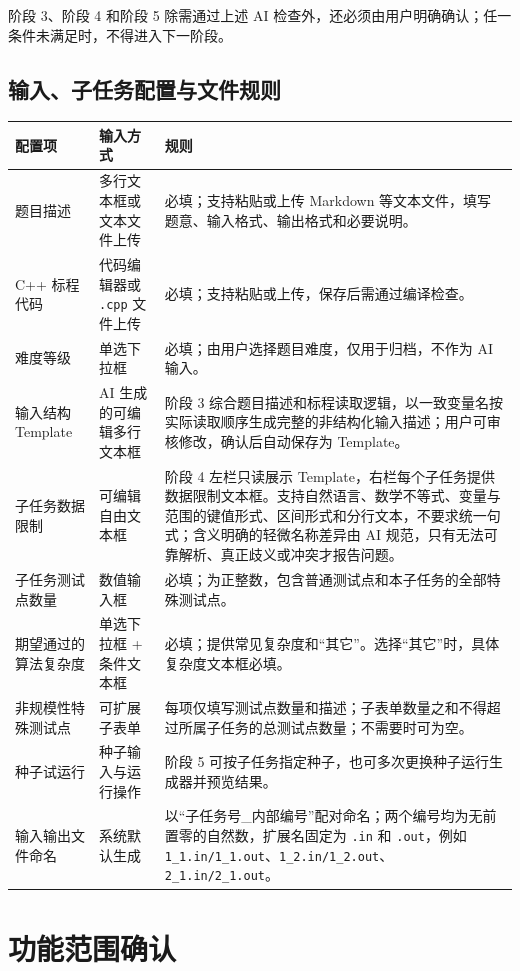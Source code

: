\documentclass[UTF8,zihao=-4]{ctexart}
\begin{document}
阶段 3、阶段 4 和阶段 5 除需通过上述 AI 检查外，还必须由用户明确确认；任一条件未满足时，不得进入下一阶段。

\subsection{输入、子任务配置与文件规则}

\begin{longtable}{p{3.2cm}p{4.1cm}p{6.2cm}}
\toprule
配置项 & 输入方式 & 规则 \\
\midrule
题目描述 & 多行文本框或文本文件上传 & 必填；支持粘贴或上传 Markdown 等文本文件，填写题意、输入格式、输出格式和必要说明。 \\
C++ 标程代码 & 代码编辑器或 \texttt{.cpp} 文件上传 & 必填；支持粘贴或上传，保存后需通过编译检查。 \\
难度等级 & 单选下拉框 & 必填；由用户选择题目难度，仅用于归档，不作为 AI 输入。 \\
输入结构 Template & AI 生成的可编辑多行文本框 & 阶段 3 综合题目描述和标程读取逻辑，以一致变量名按实际读取顺序生成完整的非结构化输入描述；用户可审核修改，确认后自动保存为 Template。 \\
子任务数据限制 & 可编辑自由文本框 & 阶段 4 左栏只读展示 Template，右栏每个子任务提供数据限制文本框。支持自然语言、数学不等式、变量与范围的键值形式、区间形式和分行文本，不要求统一句式；含义明确的轻微名称差异由 AI 规范，只有无法可靠解析、真正歧义或冲突才报告问题。 \\
子任务测试点数量 & 数值输入框 & 必填；为正整数，包含普通测试点和本子任务的全部特殊测试点。 \\
期望通过的算法复杂度 & 单选下拉框 + 条件文本框 & 必填；提供常见复杂度和“其它”。选择“其它”时，具体复杂度文本框必填。 \\
非规模性特殊测试点 & 可扩展子表单 & 每项仅填写测试点数量和描述；子表单数量之和不得超过所属子任务的总测试点数量；不需要时可为空。 \\
种子试运行 & 种子输入与运行操作 & 阶段 5 可按子任务指定种子，也可多次更换种子运行生成器并预览结果。 \\
输入输出文件命名 & 系统默认生成 & 以“子任务号\_内部编号”配对命名；两个编号均为无前置零的自然数，扩展名固定为 \texttt{.in} 和 \texttt{.out}，例如 \texttt{1\_1.in/1\_1.out}、\texttt{1\_2.in/1\_2.out}、\texttt{2\_1.in/2\_1.out}。 \\
\bottomrule
\end{longtable}

\section{功能范围确认}
\end{document}
